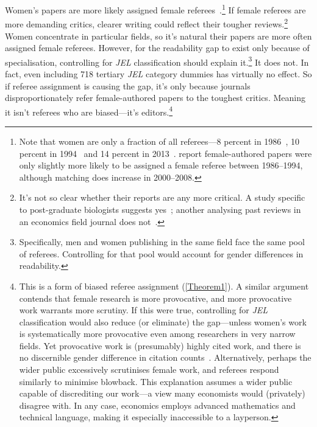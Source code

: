 Women's papers are more likely assigned female referees~\citep{Abrevaya2012,Gilbert1994}.\footnote{Note that women are only a fraction of all referees---8 percent in 1986~\citep{Blank1991}, 10 percent in 1994~\citep{Hamermesh1994} and 14 percent in 2013~\citep{Torgler2013}.  \citet{Abrevaya2012} report female-authored papers were only slightly more likely to be assigned a female referee between 1986--1994, although matching does increase in 2000--2008.} If female referees are more demanding critics, clearer writing could reflect their tougher reviews.\footnote{It's not so clear whether their reports are any more critical. A study specific to post-graduate biologists suggests yes~\citep{Borsuk2009}; another analysing past reviews in an economics field journal does not~\citep{Abrevaya2012}.} Women concentrate in particular fields, so it's natural their papers are more often assigned female referees. However, for the readability gap to exist only because of specialisation, controlling for \emph{JEL} classification should explain it.\footnote{Specifically, men and women publishing in the same field face the same pool of referees. Controlling for that pool would account for gender differences in readability.} It does not. In fact, even including 718 tertiary \emph{JEL} category dummies has virtually no effect. So if referee assignment is causing the gap, it's only because journals disproportionately refer female-authored papers to the toughest critics. Meaning it isn't referees who are biased---it's editors.\footnote{This is a form of biased referee assignment (\autoref{Theorem1}). A similar argument contends that female research is more provocative, and more provocative work warrants more scrutiny. If this were true, controlling for \emph{JEL} classification would also reduce (or eliminate) the gap---unless women's work is systematically more provocative even among researchers in very narrow fields. Yet provocative work is (presumably) highly cited work, and there is no discernible gender difference in citation counts~\citep{Ceci2014}. Alternatively, perhaps the wider public excessively scrutinises female work, and referees respond similarly to minimise blowback. This explanation assumes a wider public capable of discrediting our work---a view many economists would (privately) disagree with. In any case, economics employs advanced mathematics and technical language, making it especially inaccessible to a layperson.}

